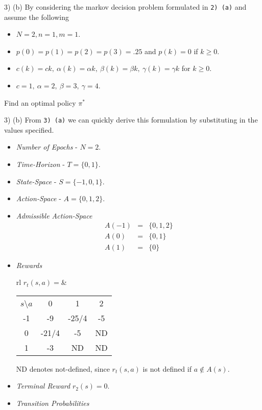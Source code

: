 \documentclass[11pt,a4paper]{article}
\begin{document}
\begin{question}{3) (b)}
  By considering the markov decision problem formulated in \texttt{2) (a)}  and assume the following
  \begin{itemize}
    \item $N=2,n=1,m=1$.
    \item $p(0)=p(1)=p(2)=p(3)=.25$ and $p(k)=0$ if $k\geq0$.
    \item $c(k)=ck,\ \alpha(k)=\alpha k,\ \beta(k)=\beta k,\ \gamma(k)=\gamma k$ for $k\geq 0$.
    \item $c=1,\ \alpha=2,\ \beta=3,\ \gamma=4$.
  \end{itemize}
  Find an optimal policy $\pi^*$
\end{question}

\begin{answer}{3) (b)}
  From \texttt{3) (a)} we can quickly derive this formulation by substituting in the values specified.
  \begin{itemize}
    \item \textit{Number of Epochs} - $N=2$.
    \item \textit{Time-Horizon} - $T=\{0,1\}$.
    \item \textit{State-Space} - $S=\{-1,0,1\}$.
    \item \textit{Action-Space} - $A=\{0,1,2\}$.
    \item \textit{Admissible Action-Space}
    \[\begin{array}{rcl}
      A(-1)&=&\{0,1,2\}\\
      A(0)&=&\{0,1\}\\
      A(1)&=&\{0\}
    \end{array}\]
    \item \textit{Rewards}
    \begin{center}
      \begin{tabular}{rl}
        $r_t(s,a)=$&
        \begin{tabular}{c|ccc}
          $s$\textbackslash $a$&0&1&2\\
          -1&-9&-25/4&-5\\
          0&-21/4&-5&ND\\
          1&-3&ND&ND
        \end{tabular}
      \end{tabular}
    \end{center}
    ND denotes not-defined, since $r_t(s,a)$ is not defined if $a\not\in A(s)$.
    \item \textit{Terminal Reward} $r_2(s)=0$.
    \item \textit{Transition Probabilities}

\end{itemize}
\end{answer}
\end{document}
